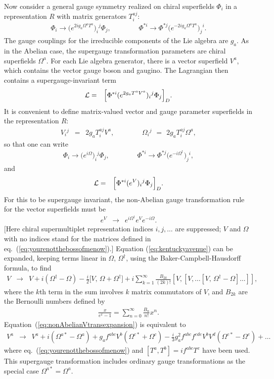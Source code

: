 \documentclass[12pt]{article}
\def\beq{\begin{eqnarray}}
\def\eeq{\end{eqnarray}}
\begin{document}
Now consider a general gauge symmetry realized on chiral superfields $\Phi_i$ in a representation $R$
with matrix generators $T^{aj}_i$:
\beq
\Phi_i \rightarrow \bigl (e^{2 i g_a \Omega^a T^a} \bigr )_i{}^j 
\Phi_j,
\qquad\qquad
\Phi^{*i} \rightarrow \Phi^{*j}
\bigl (e^{-2 i g_a \Omega^a T^a} \bigr )_j{}^i.
\eeq
The gauge couplings for the irreducible components of the Lie algebra are $g_a$. As in the Abelian case, the supergauge transformation parameters are chiral superfields $\Omega^a$.
For each Lie algebra generator, there is a
vector superfield $V^a$, which contains the vector gauge boson and gaugino. 
The Lagrangian then contains a supergauge-invariant term
\beq
{\cal L} &=& \Bigl [ \Phi^{*i} (e^{2 g_a T^a V^a})_i{}^j \Phi_j \Bigr ]_D.
\eeq
It is convenient to define matrix-valued vector and gauge parameter 
superfields in the representation $R$:
\beq
V_i{}^j &=& 2 g_a T_i^{aj} V^a ,
\qquad\qquad
\Omega_i{}^j \>\,=\,\> 2 g_a T_i^{aj} \Omega^a ,
\label{eq:yourenotthebossofmenow}
\eeq
so that one can write
\beq
\Phi_i \rightarrow \bigl (e^{i \Omega} \bigr )_i{}^j 
\Phi_j,
\qquad\qquad
\Phi^{*i} \rightarrow \Phi^{*j}
\bigl (e^{-i \Omega^\dagger} \bigr )_j{}^i ,
\eeq
and
\beq
{\cal L} &=& \Bigl [ \Phi^{*i} (e^{V})_i{}^j \Phi_j \Bigr ]_D.
\label{eq:bigbadbeluva}
\eeq
For this to be supergauge invariant, 
the non-Abelian gauge transformation rule for the vector superfields must be
\beq
e^V &\rightarrow& e^{i \Omega^\dagger} e^V e^{-i\Omega}
.
\label{eq:kentuckyavenue}
\eeq
[Here chiral supermultiplet representation indices $i,j,\ldots$ are suppressed;
$V$ and $\Omega$ with no indices stand for the matrices defined in 
eq.~(\ref{eq:yourenotthebossofmenow}).]
Equation (\ref{eq:kentuckyavenue}) can be expanded, keeping terms linear in
$\Omega$, $\Omega^\dagger$, using the Baker-Campbell-Hausdorff formula, to find
\beq
V &\rightarrow & V + i (\Omega^\dagger - \Omega) 
- \frac{i}{2} \bigl [V,\, \Omega + \Omega^\dagger ] 
+ i\sum_{k=1}^{\infty}
\frac{B_{2k}}{(2k)!} \left [ V, \left [ V,\ldots \left [V,\, \Omega^\dagger - \Omega \right ]\ldots \right]\right]
,
\phantom{xxx}
\label{eq:nonAbelianVtransexpansion}
\eeq
where the $k$th term in the sum involves $k$ matrix commutators of 
$V$, and $B_{2k}$ are the Bernoulli numbers defined by
\beq
\frac{x}{e^x - 1} = \sum_{n=0}^\infty \frac{B_n}{n!} x^n.
\eeq
Equation~(\ref{eq:nonAbelianVtransexpansion}) is equivalent to
\beq
V^a &\rightarrow& V^a + i (\Omega^{a*} - \Omega^a)
+ g_a f^{abc} V^b (\Omega^{c*} + \Omega^c)
- \frac{i}{3} g_a^2 f^{abc} f^{cde} V^b V^d (\Omega^{e*} - \Omega^e) + 
\ldots \phantom{xxx}
\label{eq:nonAbelianVtransexpansiona}
\eeq
where eq.~(\ref{eq:yourenotthebossofmenow}) and $[T^a, T^b] = i f^{abc} T^c$ have been used.
This supergauge transformation includes ordinary gauge transformations as 
the special case
$\Omega^{a*} = \Omega^a$. 
\end{document}
